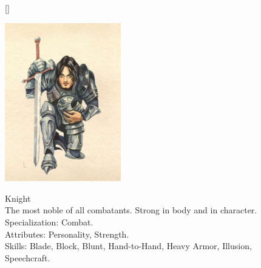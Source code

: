 \documentclass[12pt]{book}
\begin{document}
\begin{figure}[H]
[\FBwidth]
{\caption*{Knight\\

The most noble of all combatants. Strong in body and in character.\\

Specialization: Combat.\\

Attributes: Personality, Strength.\\

Skills: Blade, Block, Blunt, Hand-to-Hand, Heavy Armor, Illusion, Speechcraft.}\label{fig:test}}
{\includegraphics[width=0.45\textwidth]{Knight.png}}
\end{figure}
\end{document}
